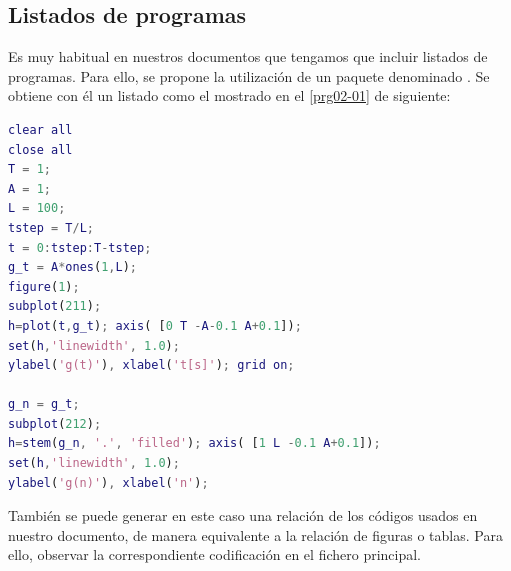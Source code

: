 \subsection{Listados de programas}
Es muy habitual en nuestros documentos que tengamos que incluir listados de programas. Para ello, se propone la utilización de un paquete denominado . Se obtiene con él un listado como el mostrado en el \autoref{prg02-01} de \matlab siguiente: 

\begin{lstlisting}[language=Matlab,caption={Representación de la función $\rect(t-T/2)$}, breaklines=true, label=prg02-01]
clear all
close all
T = 1;
A = 1;
L = 100;
tstep = T/L;                                
t = 0:tstep:T-tstep;   
g_t = A*ones(1,L); 
figure(1);
subplot(211);
h=plot(t,g_t); axis( [0 T -A-0.1 A+0.1]);
set(h,'linewidth', 1.0);
ylabel('g(t)'), xlabel('t[s]'); grid on;

g_n = g_t;
subplot(212);
h=stem(g_n, '.', 'filled'); axis( [1 L -0.1 A+0.1]);
set(h,'linewidth', 1.0);
ylabel('g(n)'), xlabel('n');
\end{lstlisting}

También se puede generar en este caso una relación de los códigos usados en nuestro documento, de manera equivalente a la relación de figuras o tablas. Para ello, observar la correspondiente codificación en el fichero principal.
 
